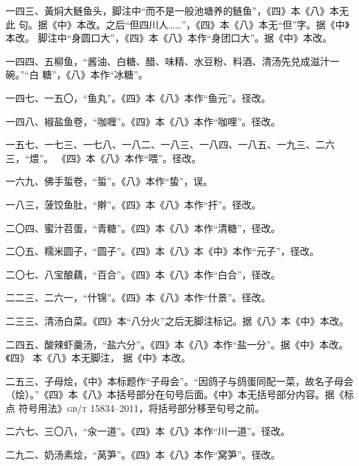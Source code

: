 \begin{list}{}
一四三、黃焖大鲢鱼头，脚注中“而不是一般池塘养的鲢鱼”，《四》本《八》本无此
句。据《中》本改。之后“但四川人……”，《四》本《八》本无“但”字。据《中》本改。
脚注中“身圆口大”，《四》本《八》本作“身团口大”。据《中》本改。

一四四、五柳鱼，“酱油、白糖、醋、味精、水豆粉、料酒、清汤先兑成滋汁一碗。”“白
糖”，《八》本作“冰糖”。

一四七、一五〇，“鱼丸”。《四》本《八》本作“鱼元”。径改。

一四八、椒盐鱼卷，“咖喱”。《四》本《八》本作“咖哩”。径改。

一五七、一七三、一七八、一八二、一八三、一八四、一八五、一九三、二六三，“煨”。
《四》本《八》本作“喂”。径改。

一六九、佛手蜇卷，“蜇”。《八》本作“蛰”，误。

一八三，菠饺鱼肚，“擀”。《四》本《八》本作“扞”。径改。

二〇四、蜜汁苕蛋，“青糖”。《四》本《八》本作“清糖”，径改。

二〇五、糯米圆子，“圆子”。《四》本《八》本《中》本作“元子”，径改。

二〇七、八宝酿藕，“百合”。《四》本《八》本作“白合”，径改。

二二三、二六一，“什锦”。《四》本《八》本作“什景”。径改。

二三三、清汤白菜。《四》本“八分火”之后无脚注标记。据《八》本《中》本改。

二四五、酸辣虾羹汤，“盐六分”。《四》本《八》本作“盐一分”。据《中》本改。《四》
本《八》本无脚注{\footnotesize{}}，
据《中》本改。

二五三、子母烩，《中》本标题作“子母会”。“因鸽子与鸽蛋同配一菜，故名子母会
（烩）。”《四》本《八》本括号部分在句号后面。《中》本无括号部分内容。据《标点
符号用法》\textsc{gb/t 15834--2011}，将括号部分移至句号之前。

二六七、三〇八，“汆一道”。《四》本《八》本作“川一道”。径改。

二九二、奶汤素烩，“莴笋”。《四》本《八》本作“窝笋”。径改。

\end{list}
\endgroup%

